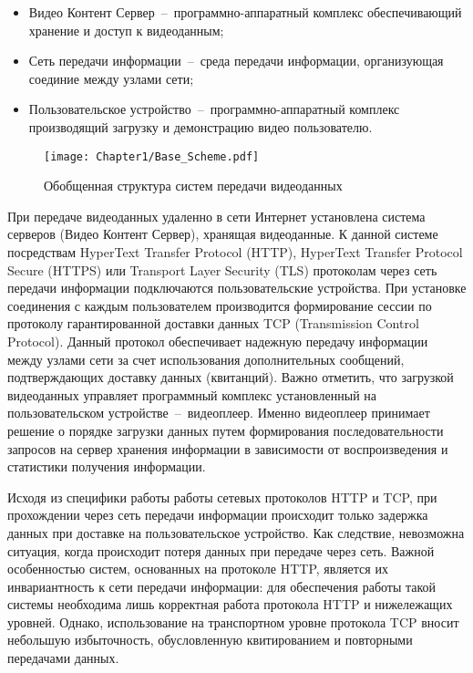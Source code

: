 \begin{itemize}
  \item Видео Контент Сервер~--~программно-аппаратный комплекс обеспечивающий хранение и доступ к видеоданным;
  \item Сеть передачи информации~--~среда передачи информации, организующая соединие между узлами сети;
  \item Пользовательское устройство~--~программно-аппаратный комплекс производящий загрузку и демонстрацию видео пользователю.
\end{itemize}

\begin{figure}[htbp]
\begin{center}
\texttt{[image: Chapter1/Base\_Scheme.pdf]}
\caption{Обобщенная структура систем передачи видеоданных}
\label{fig:Base_Scheme}
\end{center}
\end{figure}

При передаче видеоданных удаленно в сети Интернет установлена система серверов (Видео Контент Сервер), хранящая видеоданные. К данной системе посредствам HyperText Transfer Protocol (HTTP), HyperText Transfer Protocol Secure (HTTPS) или Transport Layer Security (TLS) протоколам через сеть передачи информации подключаются пользовательские устройства. При установке соединения с каждым пользователем производится формирование сессии по протоколу гарантированной доставки данных TCP (Transmission Control Protocol). Данный протокол обеспечивает надежную передачу информации между узлами сети за счет использования дополнительных сообщений, подтверждающих доставку данных (квитанций). Важно отметить, что загрузкой видеоданных управляет программный комплекс установленный на пользовательском устройстве~--~видеоплеер. Именно видеоплеер принимает решение о порядке загрузки данных путем формирования последовательности запросов на сервер хранения информации в зависимости от воспроизведения и статистики получения информации.

Исходя из специфики работы работы сетевых протоколов HTTP и TCP, при прохождении через сеть передачи информации происходит только задержка данных при доставке на пользовательское устройство. Как следствие, невозможна ситуация, когда происходит потеря данных при передаче через сеть. Важной особенностью систем, основанных на протоколе HTTP, является их инвариантность к сети передачи информации: для обеспечения работы такой системы необходима лишь корректная работа протокола HTTP и нижележащих уровней. Однако, использование на транспортном уровне протокола TCP вносит небольшую избыточность, обусловленную квитированием и повторными передачами данных.

